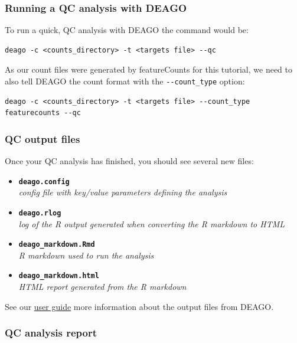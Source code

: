 \documentclass[11pt]{article}
\begin{document}
\hypertarget{running-a-qc-analysis-with-deago}{%
\subsubsection{Running a QC analysis with
DEAGO}\label{running-a-qc-analysis-with-deago}}

To run a quick, QC analysis with DEAGO the command would be:

\begin{verbatim}
deago -c <counts_directory> -t <targets file> --qc
\end{verbatim}

As our count files were generated by featureCounts for this tutorial, we
need to also tell DEAGO the count format with the
\texttt{-\/-count\_type} option:

\begin{verbatim}
deago -c <counts_directory> -t <targets file> --count_type featurecounts --qc
\end{verbatim}

\hypertarget{qc-output-files}{%
\subsubsection{QC output files}\label{qc-output-files}}

Once your QC analysis has finished, you should see several new files:

\begin{itemize}
\item
  \textbf{\texttt{deago.config}}~\\
  \textit{config file with key/value parameters defining the analysis}
\item
  \textbf{\texttt{deago.rlog}}~\\
  \textit{log of the R output generated when converting the R markdown to
  HTML}
\item
  \textbf{\texttt{deago\_markdown.Rmd}}~\\
  \textit{R markdown used to run the analysis}
\item
  \textbf{\texttt{deago\_markdown.html}}~\\
  \textit{HTML report generated from the R markdown}
\end{itemize}

See our
\href{https://github.com/sanger-pathogens/Bio-Deago/blob/master/user_guide/Output-files.ipynb}{user
guide} more information about the output files from DEAGO.

\hypertarget{qc-analysis-report}{%
\subsubsection{QC analysis report}\label{qc-analysis-report}}
\end{document}
